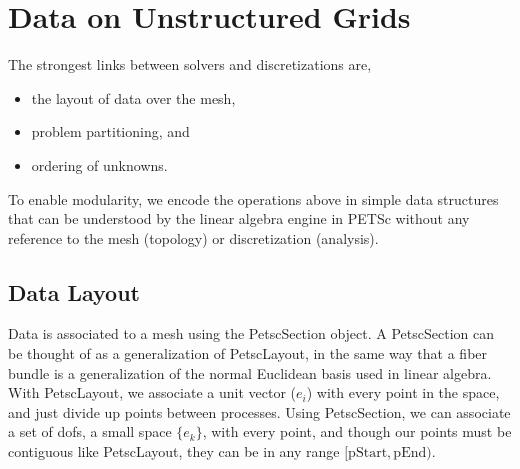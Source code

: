 {{\section{Data on Unstructured Grids} 

The strongest links between solvers and discretizations are,
\begin{itemize}
  \item the layout of data over the mesh,
  \item problem partitioning, and
  \item ordering of unknowns.
\end{itemize}
To enable modularity, we encode the operations above in simple data structures that can be understood by the linear
algebra engine in PETSc without any reference to the mesh (topology) or discretization (analysis).

\subsection{Data Layout}

Data is associated to a mesh using the PetscSection object. A PetscSection can be thought of as a generalization of
PetscLayout, in the same way that a fiber bundle is a generalization of the normal Euclidean basis used in linear
algebra. With PetscLayout, we associate a unit vector ($e_i$) with every point in the space, and just divide up points
between processes. Using PetscSection, we can associate a set of dofs, a small space $\{e_k\}$, with every point, and
though our points must be contiguous like PetscLayout, they can be in any range $[\mathrm{pStart}, \mathrm{pEnd})$.

}}
